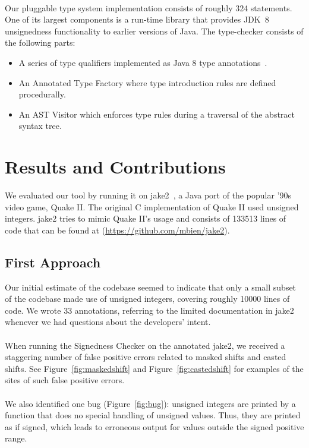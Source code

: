 \noindent\\
Our pluggable type system implementation consists of roughly 324 statements.
One of its largest components is a run-time library that provides
JDK~8 unsignedness functionality to earlier versions of Java.  The
type-checker consists of the following parts:

\begin{itemize}
  \item A series of type qualifiers implemented as Java 8 type
    annotations~\cite{JSR308-PFD}.
  \item An Annotated Type Factory where type introduction rules are defined procedurally.
  \item An AST Visitor which enforces type rules during a traversal of the
  abstract syntax tree.
\end{itemize}

\newpage
\section{Results and Contributions} \label{results}
We evaluated our tool by running it on jake2~\cite{Jake2}, a Java
port of the popular '90s video game, Quake II\@.  The original C
implementation of Quake II used unsigned integers. jake2
tries to mimic Quake II's usage and consists of 133513 lines of code that
can be found at (\url{https://github.com/mbien/jake2}).

\subsection{First Approach} \label{partial}
Our initial estimate of the codebase seemed to indicate that only a small
subset of the codebase made use of unsigned integers, covering roughly
10000 lines of code. We wrote 33 annotations, referring to the limited
documentation in jake2 whenever we had questions about the developers'
intent.\\
\\
When running the Signedness Checker on the annotated jake2, we received
a staggering number of false positive errors related to masked shifts and
casted shifts. See Figure~\ref{fig:maskedshift} and Figure~\ref{fig:castedshift}
for examples of the sites of such false positive errors.\\
\\
We also identified one bug (Figure~\ref{fig:bug}):
unsigned integers are printed by a function that does no special handling
of unsigned values.  Thus, they are printed as
if signed, which leads to erroneous output for values outside the signed
positive range.


